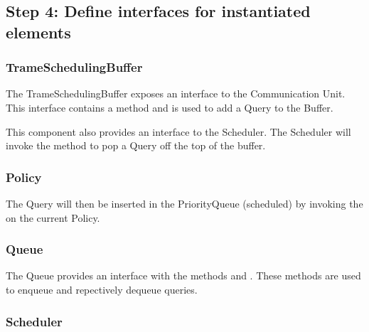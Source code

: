 \subsection{Step 4: Define interfaces for instantiated elements}
\label{add:it3/interfaces}

%


\subsubsection{TrameSchedulingBuffer}

\npar The TrameSchedulingBuffer exposes an interface
 to the Communication Unit. This interface
contains a method  and is used to add a Query to
the Buffer.

\npar This component also provides an interface to the Scheduler. The Scheduler
will invoke the method  to pop a Query off the top of the
buffer.

\subsubsection{Policy}

\npar The Query will then be inserted in the PriorityQueue (scheduled) by
invoking the  on the current
Policy. 



\subsubsection{Queue}

\npar The Queue provides an interface  with the
methods  and . These
methods are used to enqueue and repectively dequeue queries.

\subsubsection{Scheduler}

